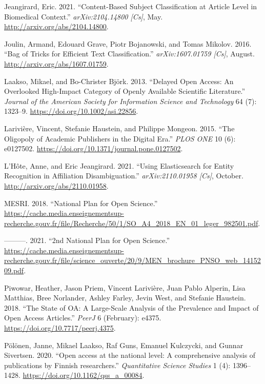 \documentclass[
]{article}
\newlength{\cslhangindent}
\newenvironment{cslreferences}%
  {\setlength{\parindent}{0pt}%
  \everypar{\setlength{\hangindent}{\cslhangindent}}\ignorespaces}%
  {\par}
\begin{document}
\begin{cslreferences}
\leavevmode\hypertarget{ref-jeangirard_content-based_2021}{}%
Jeangirard, Eric. 2021. ``Content-Based Subject Classification at
Article Level in Biomedical Context.'' \emph{arXiv:2104.14800 {[}Cs{]}},
May. \url{http://arxiv.org/abs/2104.14800}.

\leavevmode\hypertarget{ref-joulin_bag_2016}{}%
Joulin, Armand, Edouard Grave, Piotr Bojanowski, and Tomas Mikolov.
2016. ``Bag of Tricks for Efficient Text Classification.''
\emph{arXiv:1607.01759 {[}Cs{]}}, August.
\url{http://arxiv.org/abs/1607.01759}.

\leavevmode\hypertarget{ref-laakso_delayed_2013}{}%
Laakso, Mikael, and Bo-Christer Björk. 2013. ``Delayed Open Access: An
Overlooked High-Impact Category of Openly Available Scientific
Literature.'' \emph{Journal of the American Society for Information
Science and Technology} 64 (7): 1323--9.
\url{https://doi.org/10.1002/asi.22856}.

\leavevmode\hypertarget{ref-lariviere_oligopoly_2015}{}%
Larivière, Vincent, Stefanie Haustein, and Philippe Mongeon. 2015. ``The
Oligopoly of Academic Publishers in the Digital Era.'' \emph{PLOS ONE}
10 (6): e0127502. \url{https://doi.org/10.1371/journal.pone.0127502}.

\leavevmode\hypertarget{ref-lhote_using_2021}{}%
L'Hôte, Anne, and Eric Jeangirard. 2021. ``Using Elasticsearch for
Entity Recognition in Affiliation Disambiguation.''
\emph{arXiv:2110.01958 {[}Cs{]}}, October.
\url{http://arxiv.org/abs/2110.01958}.

\leavevmode\hypertarget{ref-mesri_national_2018}{}%
MESRI. 2018. ``National Plan for Open Science.''
\url{https://cache.media.enseignementsup-recherche.gouv.fr/file/Recherche/50/1/SO_A4_2018_EN_01_leger_982501.pdf}.

\leavevmode\hypertarget{ref-mesri_2nd_2021}{}%
---------. 2021. ``2nd National Plan for Open Science.''
\url{https://cache.media.enseignementsup-recherche.gouv.fr/file/science_ouverte/20/9/MEN_brochure_PNSO_web_1415209.pdf}.

\leavevmode\hypertarget{ref-piwowar_state_2018}{}%
Piwowar, Heather, Jason Priem, Vincent Larivière, Juan Pablo Alperin,
Lisa Matthias, Bree Norlander, Ashley Farley, Jevin West, and Stefanie
Haustein. 2018. ``The State of OA: A Large-Scale Analysis of the
Prevalence and Impact of Open Access Articles.'' \emph{PeerJ} 6
(February): e4375. \url{https://doi.org/10.7717/peerj.4375}.

\leavevmode\hypertarget{ref-polonen_et_al}{}%
Pölönen, Janne, Mikael Laakso, Raf Guns, Emanuel Kulczycki, and Gunnar
Sivertsen. 2020. ``Open access at the national level: A comprehensive
analysis of publications by Finnish researchers.'' \emph{Quantitative
Science Studies} 1 (4): 1396--1428.
\url{https://doi.org/10.1162/qss_a_00084}.


\end{cslreferences}
\end{document}

